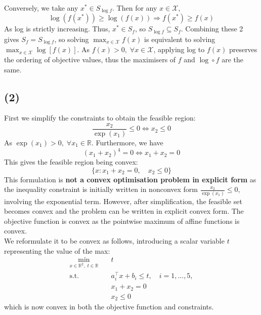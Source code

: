 \documentclass[12pt]{article}
\begin{document}
\noindent Conversely, we take any $x^{*} \in S_{\log f}$. Then for any $x \in \mathcal{X}$, \begin{equation*}
    \log (f(x^{*})) \geq \log (f(x)) \Longrightarrow f(x^{*}) \geq f(x)
\end{equation*} As log is strictly increasing. Thus, $x^{*} \in S_f$, so $S_{\log f} \subseteq S_f$. Combining these 2 gives $S_f = S_{\log f}$, so solving $\max_{x\in\mathcal{X}}f(x)$ is equivalent to solving $\max_{x\in\mathcal{X}}\log [f(x)]$. As $f(x) > 0, \; \forall x \in \mathcal{X}$, applying log to $f(x)$ preserves the ordering of objective values, thus the maximisers of $f$ and $\log \circ f$ are the same.

\subsection*{(2)}
First we simplify the constraints to obtain the feasible region: \begin{equation}
    \frac{x_{2}}{\exp (x_{1})} \leq 0 \Longleftrightarrow x_{2} \leq 0
\end{equation} As $\exp (x_{1}) > 0, \; \forall x_{1} \in \mathbb{R}$. Furthermore, we have \begin{equation}
    (x_{1} + x_{2})^{4} = 0 \Longleftrightarrow x_{1} + x_{2} = 0
\end{equation} This gives the feasible region being convex: \begin{equation*}
    \{x: x_{1} + x_{2} = 0, \quad x_{2} \leq 0\}
\end{equation*} This formulation is \textbf{not a convex optimisation problem in explicit form} as the inequality constraint is initially written in nonconvex form $\frac{x_{2}}{\exp (x_{1})} \leq 0$, involving the exponential term. However, after simplification, the feasible set becomes convex and the problem can be written in explicit convex form. The objective function is convex as the pointwise maximum of affine functions is convex. \\ 

\noindent We reformulate it to be convex as follows, introducing a scalar variable $t$ representing the value of the max: \begin{align*}
    \min_{x \in \mathbb{R}^{2}, \; t \in \mathbb{R}} \quad & t \\
    \text{s.t. } & a_i^\top x + b_i \leq t, \quad i = 1, \dots , 5, \\ 
    & x_{1} + x_{2} = 0 \\ 
    & x_{2} \leq 0
\end{align*} which is now convex in both the objective function and constraints.
\end{document}
